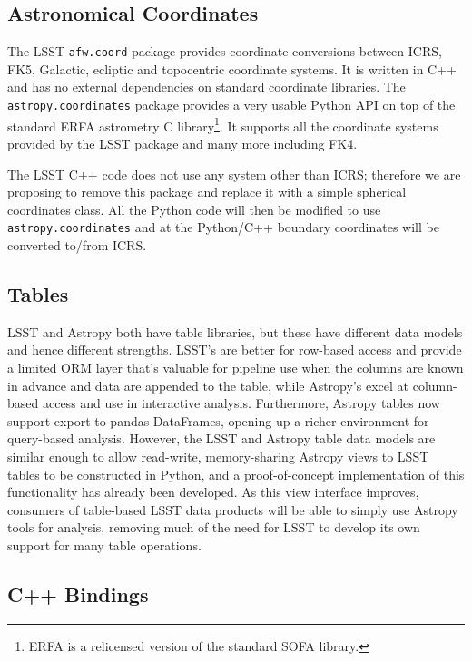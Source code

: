 \documentclass[]{spie}  %
\begin{document}
\subsection{Astronomical Coordinates}

The LSST \texttt{afw.coord} package provides coordinate conversions between ICRS, FK5, Galactic, ecliptic and topocentric coordinate systems.
It is written in C++ and has no external dependencies on standard coordinate libraries.
The \texttt{astropy.coordinates} package provides a very usable Python API on top of the standard ERFA astrometry C library\footnote{ERFA is a relicensed version of the standard SOFA library\cite{2011SchpJ...611404H}.}.
It supports all the coordinate systems provided by the LSST package and many more including FK4.

The LSST C++ code does not use any system other than ICRS; therefore we are proposing to remove this package and replace it with a simple spherical coordinates class.
All the Python code will then be modified to use \texttt{astropy.coordinates} and at the Python/C++ boundary coordinates will be converted to/from ICRS.

\subsection{Tables}

LSST and Astropy both have table libraries, but these have different data models and hence different strengths.
LSST's are better for row-based access and provide a limited ORM layer that's valuable for pipeline use when the columns are known in advance and data are appended to the table, while Astropy's excel at column-based access and use in interactive analysis.
Furthermore, Astropy tables now support export to pandas DataFrames\cite{mckinney-proc-scipy-2010}, opening up a richer environment for query-based analysis.
However, the LSST and Astropy table data models are similar enough to allow read-write, memory-sharing Astropy views to LSST tables to be constructed in Python, and a proof-of-concept implementation of this functionality has already been developed.
As this view interface improves, consumers of table-based LSST data products will be able to simply use Astropy tools for analysis, removing much of the need for LSST to develop its own support for many table operations.

\subsection{C++ Bindings}
\end{document}
